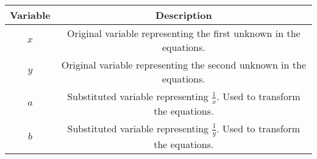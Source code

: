 \begin{tabular}{ |c|c| }
        \hline
        \textbf{Variable} & \textbf{Description} \\ 
        \hline
        $x$ & Original variable representing the first unknown in the equations. \\ 
        \hline
        $y$ & Original variable representing the second unknown in the equations. \\ 
        \hline
        $a$ & Substituted variable representing \( \frac{1}{x} \). Used to transform the equations. \\ 
        \hline
        $b$ & Substituted variable representing \( \frac{1}{y} \). Used to transform the equations. \\ 
        \hline
    \end{tabular}
